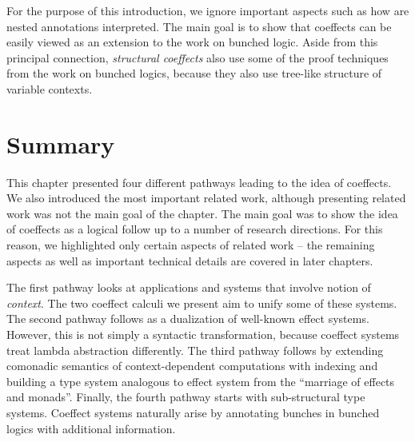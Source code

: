 For the purpose of this introduction, we ignore important aspects such as how are nested annotations
interpreted. The main goal is to show that coeffects can be easily viewed as an extension to the 
work on bunched logic. Aside from this principal connection, \emph{structural coeffects} also 
use some of the proof techniques from the work on bunched logics, because they also use tree-like
structure of variable contexts.


\section{Summary}

This chapter presented four different pathways leading to the idea of coeffects. We also 
introduced the most important related work, although presenting related work was not the
main goal of the chapter. The main goal was to show the idea of coeffects as a logical follow up
to a number of research directions. For this reason, we highlighted only certain aspects of 
related work -- the remaining aspects as well as important technical details are covered 
in later chapters.

The first pathway looks at applications and systems that involve notion of \emph{context}.
The two coeffect calculi we present aim to unify some of these systems. The second pathway
follows as a dualization of well-known effect systems. However, this is not simply a syntactic
transformation, because coeffect systems treat lambda abstraction differently. The third 
pathway follows by extending comonadic semantics of context-dependent computations with 
indexing and building a type system analogous to effect system from the ``marriage of effects
and monads''. Finally, the fourth pathway starts with sub-structural type systems. Coeffect
systems naturally arise by annotating bunches in bunched logics with additional information.


% 
